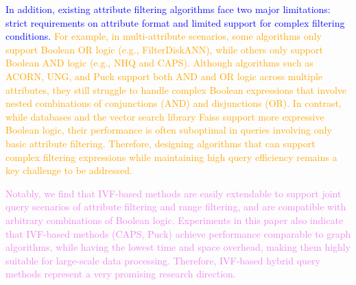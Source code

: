 \documentclass[sigconf, nonacm]{acmart}
\begin{document}
{	\textcolor{blue}{In addition, existing attribute filtering algorithms face two major limitations: strict requirements on attribute format and limited support for complex filtering conditions. }
		\textcolor{orange}{
For example, in multi-attribute scenarios, some algorithms only support Boolean OR logic (e.g., FilterDiskANN), while others only support Boolean AND logic (e.g., NHQ and CAPS). Although algorithms such as ACORN, UNG, and Puck support both AND and OR logic across multiple attributes, they still struggle to handle complex Boolean expressions that involve nested combinations of conjunctions (AND) and disjunctions (OR). In contrast, while databases and the vector search library Faiss support more expressive Boolean logic, their performance is often suboptimal in queries involving only basic attribute filtering.
Therefore, designing algorithms that can support complex filtering expressions while maintaining high query efficiency remains a key challenge to be addressed. }

\textcolor{violet}{Notably, we find that IVF-based methods are easily extendable to support joint query scenarios of attribute filtering and range filtering, and are compatible with arbitrary combinations of Boolean logic. Experiments in this paper also indicate that IVF-based methods (CAPS, Puck) achieve performance comparable to graph algorithms, while having the lowest time and space overhead, making them highly suitable for large-scale data processing. Therefore, IVF-based hybrid query methods represent a very promising research direction.}
		
}
\end{document}
